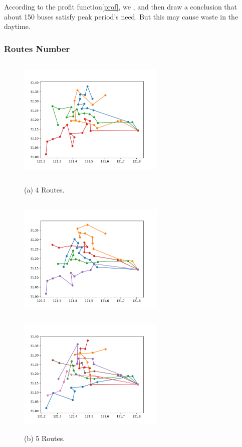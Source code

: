 \documentclass{mcmthesis}
\begin{document}
According to the profit function\ref{prof}, we , and then draw a conclusion that about 150 buses satisfy peak period's need. But this may cause waste in the daytime.

\subsubsection{Routes Number}

\begin{figure}[htbp]
    \begin{minipage}{0.44\linewidth}
      \centerline{\includegraphics[height=6cm,width=7cm]{figures/4routes.png}}
      \caption*{(a) 4 Routes.}
    \end{minipage}
    \begin{minipage}{0.44\linewidth}
      \centerline{\includegraphics[height=6cm,width=7cm]{figures/5routes.png}}
      \caption*{(b) 5 Routes.}
    \end{minipage}
    \begin{minipage}{0.44\linewidth}
      \centerline{\includegraphics[height=6cm,width=7cm]{figures/7routes.png}}

\end{minipage}
\end{figure}
\end{document}
